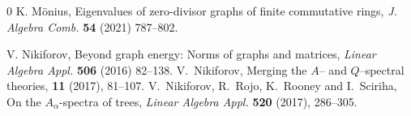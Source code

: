 \documentclass[12pt,twoside]{article}
\begin{document}
\begin{thebibliography}{0}
		 K. Mönius, Eigenvalues of zero-divisor graphs of finite commutative rings, \textit{J. Algebra Comb.} \textbf{54} (2021) 787--802.
		
		 V. Nikiforov, Beyond graph energy: Norms of graphs and matrices, \emph{Linear Algebra Appl.} \textbf{506} (2016) 82--138.
		V.~Nikiforov,
		\newblock Merging the $A$– and $Q$–spectral theories,
		 {\bf 11} (2017), 81--107.
		V.~Nikiforov, R.~Rojo, K.~Rooney and I.~Sciriha,
		On the $A_\alpha$-spectra of trees,
		\emph{Linear Algebra Appl.} \textbf{520} (2017), 286--305.
		

\end{thebibliography}
\end{document}
